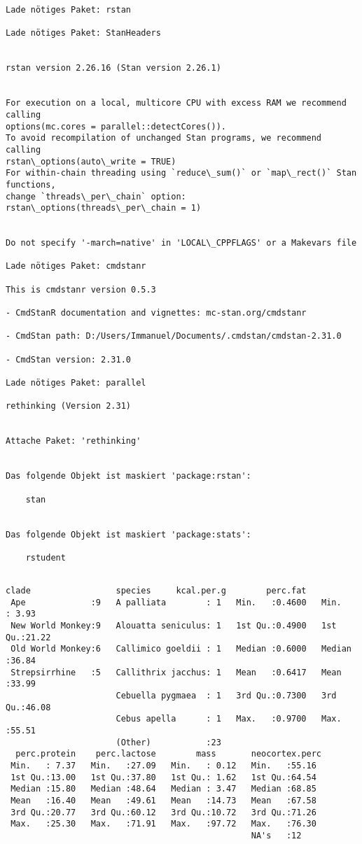 \documentclass[11pt]{article}
\begin{document}
    \begin{Verbatim}[commandchars=\\\{\}]
Lade nötiges Paket: rstan

Lade nötiges Paket: StanHeaders


rstan version 2.26.16 (Stan version 2.26.1)


For execution on a local, multicore CPU with excess RAM we recommend calling
options(mc.cores = parallel::detectCores()).
To avoid recompilation of unchanged Stan programs, we recommend calling
rstan\_options(auto\_write = TRUE)
For within-chain threading using `reduce\_sum()` or `map\_rect()` Stan functions,
change `threads\_per\_chain` option:
rstan\_options(threads\_per\_chain = 1)


Do not specify '-march=native' in 'LOCAL\_CPPFLAGS' or a Makevars file

Lade nötiges Paket: cmdstanr

This is cmdstanr version 0.5.3

- CmdStanR documentation and vignettes: mc-stan.org/cmdstanr

- CmdStan path: D:/Users/Immanuel/Documents/.cmdstan/cmdstan-2.31.0

- CmdStan version: 2.31.0

Lade nötiges Paket: parallel

rethinking (Version 2.31)


Attache Paket: 'rethinking'


Das folgende Objekt ist maskiert 'package:rstan':

    stan


Das folgende Objekt ist maskiert 'package:stats':

    rstudent


    \end{Verbatim}

    
    \begin{Verbatim}[commandchars=\\\{\}]
              clade                 species     kcal.per.g        perc.fat    
 Ape             :9   A palliata        : 1   Min.   :0.4600   Min.   : 3.93  
 New World Monkey:9   Alouatta seniculus: 1   1st Qu.:0.4900   1st Qu.:21.22  
 Old World Monkey:6   Callimico goeldii : 1   Median :0.6000   Median :36.84  
 Strepsirrhine   :5   Callithrix jacchus: 1   Mean   :0.6417   Mean   :33.99  
                      Cebuella pygmaea  : 1   3rd Qu.:0.7300   3rd Qu.:46.08  
                      Cebus apella      : 1   Max.   :0.9700   Max.   :55.51  
                      (Other)           :23                                   
  perc.protein    perc.lactose        mass       neocortex.perc 
 Min.   : 7.37   Min.   :27.09   Min.   : 0.12   Min.   :55.16  
 1st Qu.:13.00   1st Qu.:37.80   1st Qu.: 1.62   1st Qu.:64.54  
 Median :15.80   Median :48.64   Median : 3.47   Median :68.85  
 Mean   :16.40   Mean   :49.61   Mean   :14.73   Mean   :67.58  
 3rd Qu.:20.77   3rd Qu.:60.12   3rd Qu.:10.72   3rd Qu.:71.26  
 Max.   :25.30   Max.   :71.91   Max.   :97.72   Max.   :76.30  
                                                 NA's   :12     
    \end{Verbatim}
\end{document}
